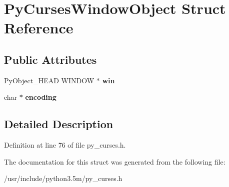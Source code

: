 \hypertarget{structPyCursesWindowObject}{}\section{Py\+Curses\+Window\+Object Struct Reference}
\label{structPyCursesWindowObject}
\subsection*{Public Attributes}
\begin{DoxyCompactItemize}
\item 
Py\+Object\+\_\+\+H\+E\+AD W\+I\+N\+D\+OW $\ast$ {\bfseries win}\hypertarget{structPyCursesWindowObject_ad963a38c3738dce76f378c668a3254ba}{}\label{structPyCursesWindowObject_ad963a38c3738dce76f378c668a3254ba}

\item 
char $\ast$ {\bfseries encoding}\hypertarget{structPyCursesWindowObject_acb87d4212914c1a58641487470e36d1b}{}\label{structPyCursesWindowObject_acb87d4212914c1a58641487470e36d1b}

\end{DoxyCompactItemize}


\subsection{Detailed Description}


Definition at line 76 of file py\+\_\+curses.\+h.



The documentation for this struct was generated from the following file\+:\begin{DoxyCompactItemize}
\item 
/usr/include/python3.\+5m/py\+\_\+curses.\+h\end{DoxyCompactItemize}
